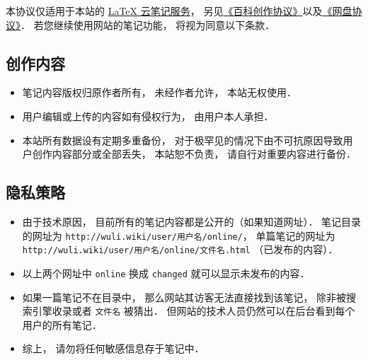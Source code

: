 
本协议仅适用于本站的 \href{http://example.com}{LaTeX 云笔记服务}， 另见\href{http://wuli.wiki/online/licens.html}{《百科创作协议》}以及\href{http://www.example.com}{《网盘协议》}． 若您继续使用网站的笔记功能， 将视为同意以下条款．

\subsection{创作内容}
\begin{itemize}
\item 笔记内容版权归原作者所有， 未经作者允许， 本站无权使用．
\item 用户编辑或上传的内容如有侵权行为， 由用户本人承担．
\item 本站所有数据设有定期多重备份， 对于极罕见的情况下由不可抗原因导致用户创作内容部分或全部丢失， 本站恕不负责， 请自行对重要内容进行备份．
\end{itemize}

\subsection{隐私策略}
\begin{itemize}
\item 由于技术原因， 目前所有的笔记内容都是公开的（如果知道网址）． 笔记目录的网址为 \verb|http://wuli.wiki/user/用户名/online/|， 单篇笔记的网址为 \verb|http://wuli.wiki/user/用户名/online/文件名.html| （已发布的内容）．
\item 以上两个网址中 \verb|online| 换成 \verb|changed| 就可以显示未发布的内容．
\item 如果一篇笔记不在目录中， 那么网站其访客无法直接找到该笔记， 除非被搜索引擎收录或者 \verb|文件名| 被猜出． 但网站的技术人员仍然可以在后台看到每个用户的所有笔记．
\item 综上， 请勿将任何敏感信息存于笔记中．
\end{itemize}
